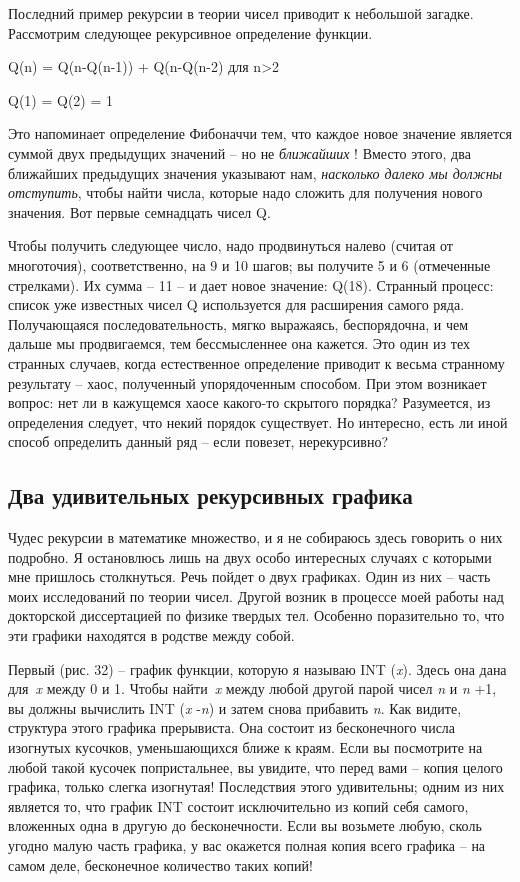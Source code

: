 \documentclass[../main.tex]{subfiles}
\begin{document}
Последний пример рекурсии в теории чисел приводит к небольшой загадке. Рассмотрим следующее рекурсивное определение функции.

Q(n) = Q(n-Q(n-1)) + Q(n-Q(n-2) для n\textgreater2

Q(1) = Q(2) = 1

Это напоминает определение Фибоначчи тем, что каждое новое значение является суммой двух предыдущих значений \--- но не \emph{ближайших} ! Вместо этого, два ближайших предыдущих значения указывают нам, \emph{насколько далеко мы должны отступить}, чтобы найти числа, которые надо сложить для получения нового значения. Вот первые семнадцать чисел Q.

Чтобы получить следующее число, надо продвинуться налево (считая от многоточия), соответственно, на 9 и 10 шагов; вы получите 5 и 6 (отмеченные стрелками). Их сумма \--- 11 \--- и дает новое значение: Q(18). Странный процесс: список уже известных чисел Q используется для расширения самого ряда. Получающаяся последовательность, мягко выражаясь, беспорядочна, и чем дальше мы продвигаемся, тем бессмысленнее она кажется. Это один из тех странных случаев, когда естественное определение приводит к весьма странному результату \--- хаос, полученный упорядоченным способом. При этом возникает вопрос: нет ли в кажущемся хаосе какого-то скрытого порядка? Разумеется, из определения следует, что некий порядок существует. Но интересно, есть ли иной способ определить данный ряд \--- если повезет, нерекурсивно?


\subsection{Два удивительных рекурсивных графика}

Чудес рекурсии в математике множество, и я не собираюсь здесь говорить о них подробно. Я остановлюсь лишь на двух особо интересных случаях с которыми мне пришлось столкнуться. Речь пойдет о двух графиках. Один из них \--- часть моих исследований по теории чисел. Другой возник в процессе моей работы над докторской диссертацией по физике твердых тел. Особенно поразительно то, что эти графики находятся в родстве между собой.

Первый (рис. 32) \--- график функции, которую я называю INT (\emph{x}). Здесь она дана для~\emph{x} между 0 и 1. Чтобы найти~\emph{x} между любой другой парой чисел \emph{n} и \emph{n} +1, вы должны вычислить INT (\emph{x} -\emph{n}) и затем снова прибавить \emph{n}. Как видите, структура этого графика прерывиста. Она состоит из бесконечного числа изогнутых кусочков, уменьшающихся ближе к краям. Если вы посмотрите на любой такой кусочек попристальнее, вы увидите, что перед вами \--- копия целого графика, только слегка изогнутая! Последствия этого удивительны; одним из них является то, что график INT состоит исключительно из копий себя самого, вложенных одна в другую до бесконечности. Если вы возьмете любую, сколь угодно малую часть графика, у вас окажется полная копия всего графика \--- на самом деле, бесконечное количество таких копий!
\end{document}
